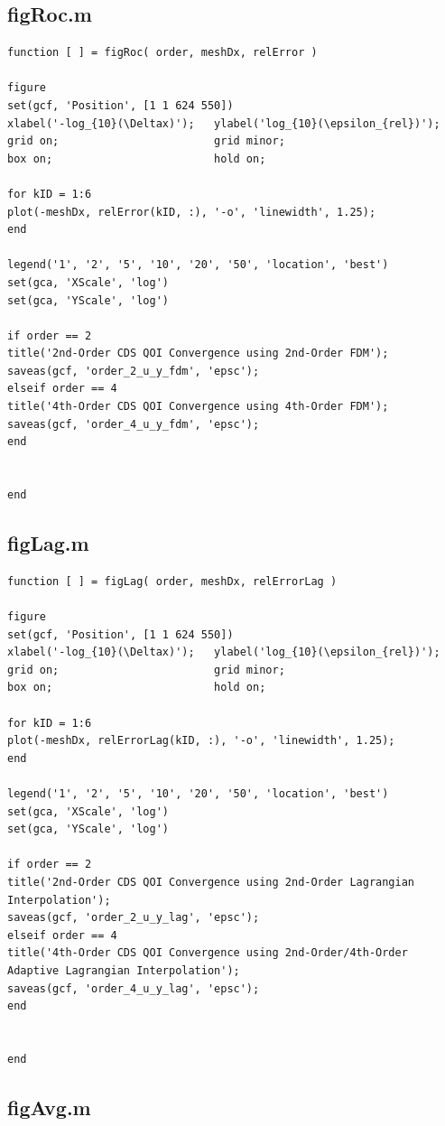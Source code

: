 \documentclass[10pt]{article}		%
\numberwithin{equation}{section}
\begin{document}
\subsection{figRoc.m}

\begin{lstlisting}
function [ ] = figRoc( order, meshDx, relError )

figure
set(gcf, 'Position', [1 1 624 550])
xlabel('-log_{10}(\Deltax)');   ylabel('log_{10}(\epsilon_{rel})');
grid on;                        grid minor;
box on;                         hold on;

for kID = 1:6
plot(-meshDx, relError(kID, :), '-o', 'linewidth', 1.25);
end

legend('1', '2', '5', '10', '20', '50', 'location', 'best')
set(gca, 'XScale', 'log')
set(gca, 'YScale', 'log')

if order == 2
title('2nd-Order CDS QOI Convergence using 2nd-Order FDM');
saveas(gcf, 'order_2_u_y_fdm', 'epsc');
elseif order == 4
title('4th-Order CDS QOI Convergence using 4th-Order FDM');
saveas(gcf, 'order_4_u_y_fdm', 'epsc');
end


end
\end{lstlisting}

\subsection{figLag.m}

\begin{lstlisting}
function [ ] = figLag( order, meshDx, relErrorLag )

figure
set(gcf, 'Position', [1 1 624 550])
xlabel('-log_{10}(\Deltax)');   ylabel('log_{10}(\epsilon_{rel})');
grid on;                        grid minor;
box on;                         hold on;

for kID = 1:6
plot(-meshDx, relErrorLag(kID, :), '-o', 'linewidth', 1.25);
end

legend('1', '2', '5', '10', '20', '50', 'location', 'best')
set(gca, 'XScale', 'log')
set(gca, 'YScale', 'log')

if order == 2
title('2nd-Order CDS QOI Convergence using 2nd-Order Lagrangian Interpolation');
saveas(gcf, 'order_2_u_y_lag', 'epsc');
elseif order == 4
title('4th-Order CDS QOI Convergence using 2nd-Order/4th-Order Adaptive Lagrangian Interpolation');
saveas(gcf, 'order_4_u_y_lag', 'epsc');
end


end
\end{lstlisting}

\subsection{figAvg.m}
\end{document}
